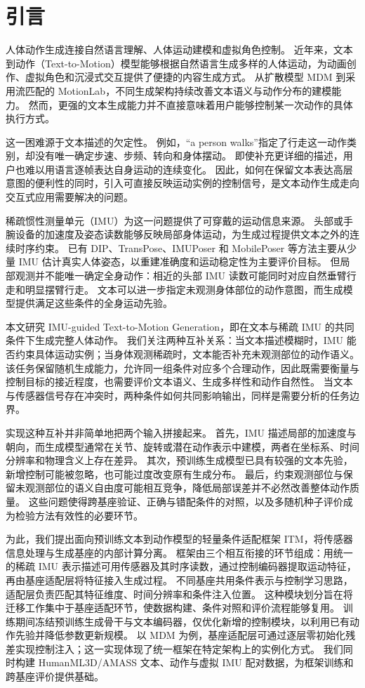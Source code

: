 \section{引言}
\label{sec:1_introduction}

人体动作生成连接自然语言理解、人体运动建模和虚拟角色控制。
近年来，文本到动作（Text-to-Motion）模型能够根据自然语言生成多样的人体运动，为动画创作、虚拟角色和沉浸式交互提供了便捷的内容生成方式。
从扩散模型 MDM 到采用流匹配的 MotionLab，不同生成架构持续改善文本语义与动作分布的建模能力。
然而，更强的文本生成能力并不直接意味着用户能够控制某一次动作的具体执行方式。

这一困难源于文本描述的欠定性。
例如，“a person walks”指定了行走这一动作类别，却没有唯一确定步速、步频、转向和身体摆动。
即使补充更详细的描述，用户也难以用语言逐帧表达自身运动的连续变化。
因此，如何在保留文本表达高层意图的便利性的同时，引入可直接反映运动实例的控制信号，是文本动作生成走向交互式应用需要解决的问题。

稀疏惯性测量单元（IMU）为这一问题提供了可穿戴的运动信息来源。
头部或手腕设备的加速度及姿态读数能够反映局部身体运动，为生成过程提供文本之外的连续时序约束。
已有 DIP、TransPose、IMUPoser 和 MobilePoser 等方法主要从少量 IMU 估计真实人体姿态，以重建准确度和运动稳定性为主要评价目标。
但局部观测并不能唯一确定全身动作：相近的头部 IMU 读数可能同时对应自然垂臂行走和明显摆臂行走。
文本可以进一步指定未观测身体部位的动作意图，而生成模型提供满足这些条件的全身运动先验。

本文研究 IMU-guided Text-to-Motion Generation，即在文本与稀疏 IMU 的共同条件下生成完整人体动作。
我们关注两种互补关系：当文本描述模糊时，IMU 能否约束具体运动实例；当身体观测稀疏时，文本能否补充未观测部位的动作语义。
该任务保留随机生成能力，允许同一组条件对应多个合理动作，因此既需要衡量与控制目标的接近程度，也需要评价文本语义、生成多样性和动作自然性。
当文本与传感器信号存在冲突时，两种条件如何共同影响输出，同样是需要分析的任务边界。

实现这种互补并非简单地把两个输入拼接起来。
首先，IMU 描述局部的加速度与朝向，而生成模型通常在关节、旋转或潜在动作表示中建模，两者在坐标系、时间分辨率和物理含义上存在差异。
其次，预训练生成模型已具有较强的文本先验，新增控制可能被忽略，也可能过度改变原有生成分布。
最后，约束观测部位与保留未观测部位的语义自由度可能相互竞争，降低局部误差并不必然改善整体动作质量。
这些问题使得跨基座验证、正确与错配条件的对照，以及多随机种子评价成为检验方法有效性的必要环节。

为此，我们提出面向预训练文本到动作模型的轻量条件适配框架 ITM，将传感器信息处理与生成基座的内部计算分离。
框架由三个相互衔接的环节组成：用统一的稀疏 IMU 表示描述可用传感器及其时序读数，通过控制编码器提取运动特征，再由基座适配层将特征接入生成过程。
不同基座共用条件表示与控制学习思路，适配层负责匹配其特征维度、时间分辨率和条件注入位置。
这种模块划分旨在将迁移工作集中于基座适配环节，使数据构建、条件对照和评价流程能够复用。
训练期间冻结预训练生成骨干与文本编码器，仅优化新增的控制模块，以利用已有动作先验并降低参数更新规模。
以 MDM 为例，基座适配层可通过逐层零初始化残差实现控制注入；这一实现体现了统一框架在特定架构上的实例化方式。
我们同时构建 HumanML3D/AMASS 文本、动作与虚拟 IMU 配对数据，为框架训练和跨基座评价提供基础。

